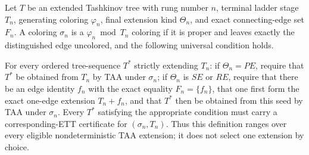 \begin{definition}
Let \(T\) be an extended Tashkinov tree with rung number \(n\), terminal
ladder stage \(T_n\), generating coloring \(\varphi_n\), final extension
kind \(\Theta_n\), and exact connecting-edge set \(F_n\).  A coloring
\(\sigma_n\) is a \(\varphi_n\bmod T_n\) coloring if it is proper and
leaves exactly the distinguished edge uncolored, and the following
universal condition holds.

For every ordered tree-sequence \(T^*\) strictly extending \(T_n\):
if \(\Theta_n=PE\), require that \(T^*\) be obtained from \(T_n\) by TAA
under \(\sigma_n\); if \(\Theta_n\) is \(SE\) or \(RE\), require that
there be an edge identity \(f_n\) with the exact equality
\(F_n=\{f_n\}\), that one first form the exact one-edge extension
\(T_n+f_n\), and that \(T^*\) then be obtained from this seed by TAA under
\(\sigma_n\).  Every \(T^*\) satisfying the appropriate condition must
carry a corresponding-ETT certificate for \((\sigma_n,T_n)\).  Thus this
definition ranges over every eligible nondeterministic TAA extension; it
does not select one extension by choice.
\end{definition}
